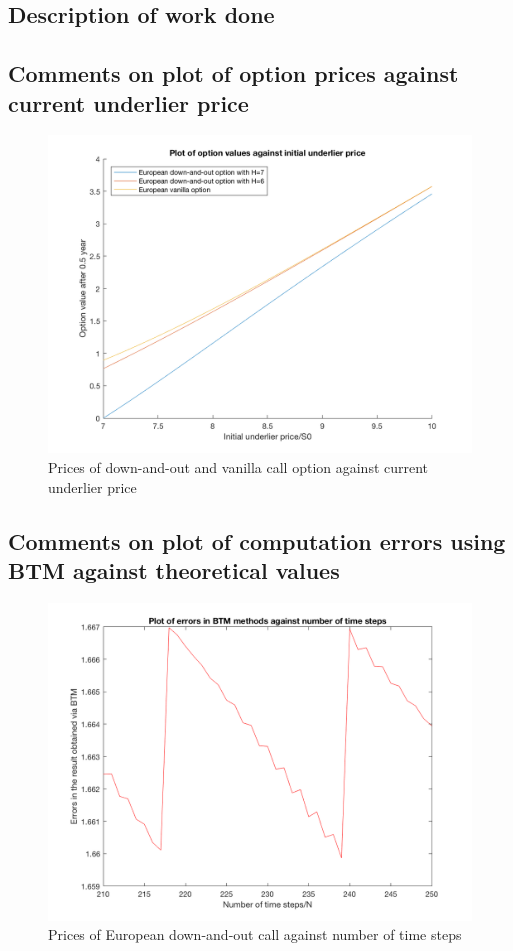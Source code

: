 \subsection{Description of work done}

\subsection{Comments on plot of option prices against current underlier price}

\begin{figure}[h]
	\centering
	\includegraphics[scale=0.3]{A1_1_plot.png}
	\caption{Prices of down-and-out and vanilla call option against current underlier price}
\end{figure}

\subsection{Comments on plot of computation errors using BTM against theoretical values}

\begin{figure}[h]
	\centering
	\includegraphics[scale=0.3]{A1_4_plot.PNG}
	\caption{Prices of European down-and-out call against number of time steps}
\end{figure}

